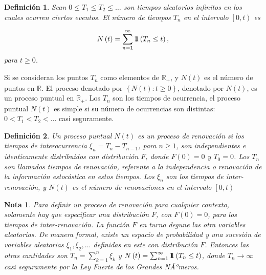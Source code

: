 \documentclass{article}
\newtheorem{Def}{Definición}
\newtheorem{Note}{Nota}
\newcommand{\rea}{\mathbb{R}}
\newcommand{\indora}{\mbox{$1$\hspace{-0.8ex}$1$}}
\begin{document}
\begin{Def}%
Sean $0\leq T_{1}\leq T_{2}\leq \ldots$ son tiempos aleatorios infinitos en los cuales ocurren ciertos eventos. El n\'umero de tiempos $T_{n}$ en el intervalo $\left[0,t\right)$ es

\begin{eqnarray}
N\left(t\right)=\sum_{n=1}^{\infty}\indora\left(T_{n}\leq t\right),
\end{eqnarray}
para $t\geq0$.
\end{Def}

Si se consideran los puntos $T_{n}$ como elementos de $\rea_{+}$, y $N\left(t\right)$ es el n\'umero de puntos en $\rea$. El proceso denotado por $\left\{N\left(t\right):t\geq0\right\}$, denotado por $N\left(t\right)$, es un proceso puntual en $\rea_{+}$. Los $T_{n}$ son los tiempos de ocurrencia, el proceso puntual $N\left(t\right)$ es simple si su n\'umero de ocurrencias son distintas: $0<T_{1}<T_{2}<\ldots$ casi seguramente.

\begin{Def}
Un proceso puntual $N\left(t\right)$ es un proceso de renovaci\'on si los tiempos de interocurrencia $\xi_{n}=T_{n}-T_{n-1}$, para $n\geq1$, son independientes e identicamente distribuidos con distribuci\'on $F$, donde $F\left(0\right)=0$ y $T_{0}=0$. Los $T_{n}$ son llamados tiempos de renovaci\'on, referente a la independencia o renovaci\'on de la informaci\'on estoc\'astica en estos tiempos. Los $\xi_{n}$ son los tiempos de inter-renovaci\'on, y $N\left(t\right)$ es el n\'umero de renovaciones en el intervalo $\left[0,t\right)$
\end{Def}


\begin{Note}
Para definir un proceso de renovaci\'on para cualquier contexto, solamente hay que especificar una distribuci\'on $F$, con $F\left(0\right)=0$, para los tiempos de inter-renovaci\'on. La funci\'on $F$ en turno degune las otra variables aleatorias. De manera formal, existe un espacio de probabilidad y una sucesi\'on de variables aleatorias $\xi_{1},\xi_{2},\ldots$ definidas en este con distribuci\'on $F$. Entonces las otras cantidades son $T_{n}=\sum_{k=1}^{n}\xi_{k}$ y $N\left(t\right)=\sum_{n=1}^{\infty}\indora\left(T_{n}\leq t\right)$, donde $T_{n}\rightarrow\infty$ casi seguramente por la Ley Fuerte de los Grandes NÃºmeros.
\end{Note}

%
%
\end{document}
